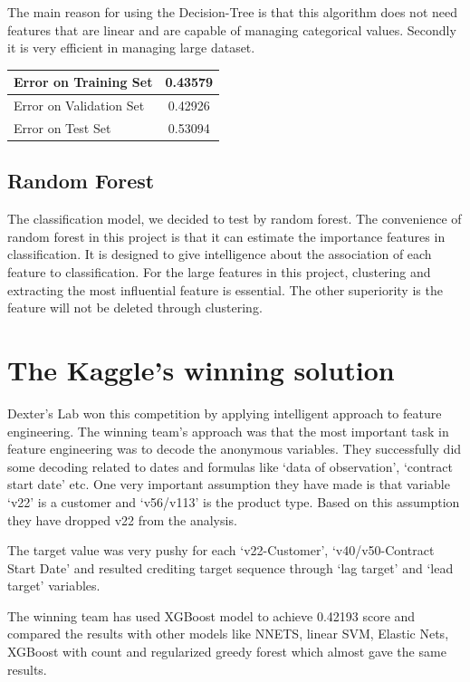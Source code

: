 \documentclass[conference, onecolumn]{IEEEtran}
\begin{document}
The main reason for using the Decision-Tree is that this algorithm does not need features that are linear and are capable of managing categorical values. Secondly it is very efficient in managing large dataset. 

\begin{center}
\begin{tabular}{ |l|c| } 
 \hline
Error on Training Set & 0.43579  \\ \hline
Error on Validation Set & 0.42926 \\ \hline
Error on Test Set & 0.53094\\ \hline
\end{tabular}
\end{center}

\subsection{Random Forest}


The classification model, we decided to test by random forest. The convenience of random forest in this project is that it can estimate the importance features in classification. It is designed to give intelligence about the association of each feature to classification. For the large features in this project, clustering and extracting the most influential feature is essential. The other superiority is the feature will not be deleted through clustering. 



\section{The Kaggle's winning solution}
Dexter’s Lab won this competition by applying intelligent approach to feature engineering.  The winning team's approach was that the most important task in feature engineering was to decode the anonymous variables. They successfully did some decoding related to dates and formulas like ‘data of observation’, ‘contract start date’ etc. One very important assumption they have made is that variable ‘v22’ is a customer and ‘v56/v113’ is the product type. Based on this assumption they have dropped v22 from the analysis.

The target value was very pushy for each ‘v22-Customer’, ‘v40/v50-Contract Start Date’ and resulted crediting target sequence through ‘lag target’ and ‘lead target’ variables. 

The winning team has used XGBoost model to achieve 0.42193 score and compared the results with other models like NNETS, linear SVM, Elastic Nets, XGBoost with count and regularized greedy forest which almost gave the same results.
\end{document}
